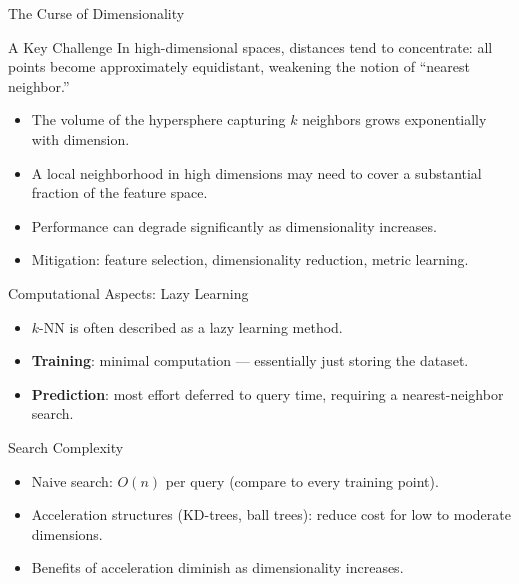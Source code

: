 \begin{frame}{The Curse of Dimensionality}
  \begin{alertblock}{A Key Challenge}
    In high-dimensional spaces, distances tend to \alert{concentrate}: all points become approximately equidistant, weakening the notion of ``nearest neighbor.''
  \end{alertblock}
  \vspace{0.4em}
  \begin{itemize}
    \item The volume of the hypersphere capturing $k$ neighbors grows exponentially with dimension.
    \item A local neighborhood in high dimensions may need to cover a substantial fraction of the feature space.
    \item Performance can degrade significantly as dimensionality increases.
    \item Mitigation: feature selection, dimensionality reduction, metric learning.
  \end{itemize}
\end{frame}

\begin{frame}{Computational Aspects: Lazy Learning}
  \begin{itemize}
    \item $k$-NN is often described as a \alert{lazy} learning method.
    \item \textbf{Training}: minimal computation — essentially just storing the dataset.
    \item \textbf{Prediction}: most effort deferred to query time, requiring a nearest-neighbor search.
  \end{itemize}
  \vspace{0.4em}
  \begin{block}{Search Complexity}
    \begin{itemize}
      \item Naive search: $O(n)$ per query (compare to every training point).
      \item Acceleration structures (KD-trees, ball trees): reduce cost for low to moderate dimensions.
      \item Benefits of acceleration \alert{diminish as dimensionality increases}.
    \end{itemize}
  \end{block}
\end{frame}

